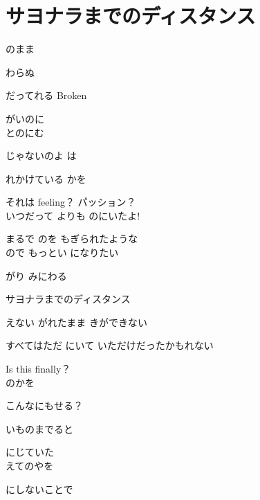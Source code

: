 \section{ サヨナラまでのディスタンス}
\large{

のまま 

わらぬ 

だってれる Broken

がいのに
\\

とのにむ

じゃないのよ は

れかけている かを

それは feeling？ パッション？
\\

いつだって よりも のにいたよ!

まるで のを もぎられたような
\\

ので もっとい になりたい

がり みにわる

サヨナラまでのディスタンス

えない がれたまま きができない

すべてはただ にいて いただけだったかもれない

Is this finally？
\\

のかを

こんなにもせる？

いものまでると

にじていた
\\

えてのやを

にしないことで

}

